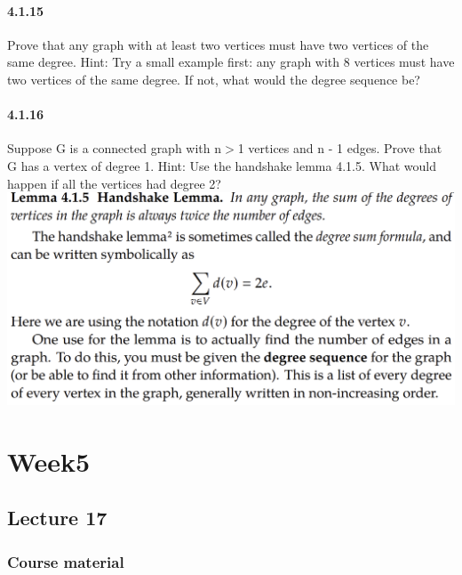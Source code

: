 \documentclass{article}
\begin{document}
\paragraph{4.1.15}
Prove that any graph with at least two vertices must have two vertices
of the same degree.\newline
Hint:\newline
Try a small example first: any graph with 8 vertices must have two
vertices of the same degree. If not, what would the degree sequence be?
\paragraph{4.1.16}
Suppose G is a connected graph with n$ > $1 vertices and n - 1 edges.
Prove that G has a vertex of degree 1. \newline
Hint:\newline
Use the handshake lemma 4.1.5. What would happen if all the
vertices had degree 2?\newline
\includegraphics{0054}
\newpage \section{Week5}
\subsection{Lecture 17}
\subsubsection{Course material}
\end{document}
